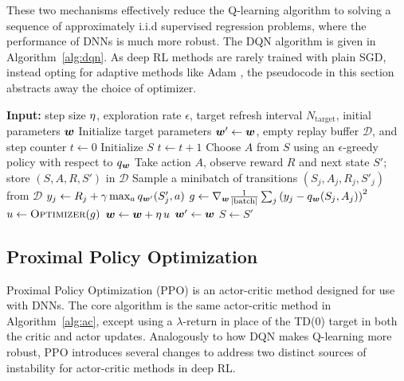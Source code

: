 These two mechanisms effectively reduce the Q-learning algorithm to solving a sequence of approximately i.i.d supervised regression problems, where the performance of DNNs is much more robust. The DQN algorithm is given in Algorithm~\ref{alg:dqn}. As deep RL methods are rarely trained with plain SGD, instead opting for adaptive methods like Adam \cite{kingma2015adam}, the pseudocode in this section abstracts away the choice of optimizer.

\begin{algorithm}[htbp]
\caption{Deep Q-Learning (DQN)}
\label{alg:dqn}
\begin{algorithmic}[1]
\State \textbf{Input:} step size $\eta$, exploration rate $\epsilon$, target refresh interval $N_{\text{target}}$, initial parameters ${\bm w}$
\State Initialize target parameters ${\bm w}' \gets {\bm w}$, empty replay buffer $\mathcal{D}$, and step counter $t \gets 0$
    \State Initialize $S$
        \State $t \gets t + 1$
        \State Choose $A$ from $S$ using an $\epsilon$-greedy policy with respect to $q_{\bm w}$
        \State Take action $A$, observe reward $R$ and next state $S'$; store $(S, A, R, S')$ in $\mathcal{D}$
        \State Sample a minibatch of transitions $(S_j, A_j, R_j, S'_j)$ from $\mathcal{D}$
        \State $y_j \gets R_j + \gamma \max_{a} q_{{\bm w}'}(S'_j, a)$ 
        \State $g \gets \nabla_{{\bm w}} \frac{1}{|\text{batch}|}\sum_j \left( y_j - q_{\bm w}(S_j, A_j) \right)^2$ 
        \State $\update \gets \textproc{Optimizer}(g)$ 
        \State ${\bm w} \gets {\bm w} + \eta\, u$
            \State ${\bm w}' \gets {\bm w}$ 
        \EndIf
        \State $S \gets S'$
    \EndWhile
\EndFor
\end{algorithmic}
\end{algorithm}

\FloatBarrier
\subsection{Proximal Policy Optimization}
Proximal Policy Optimization (PPO)  is an actor-critic method designed for use with DNNs. The core algorithm is the same actor-critic method in Algorithm~\ref{alg:ac}, except using a $\lambda$-return in place of the TD(0) target in both the critic and actor updates. Analogously to how DQN makes Q-learning more robust, PPO introduces several changes to address two distinct sources of instability for actor-critic methods in deep RL.

